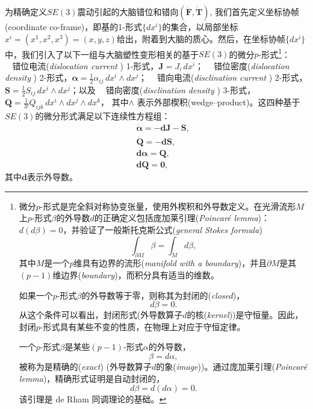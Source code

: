 \documentclass[11pt,fontset=founder]{ctexart}
\begin{document}
为精确定义$SE(3)$震动引起的大脑错位和错向$(\boldsymbol{\dot{\mathbf F},\dot{\mathbf T}})$, 我们首先定义坐标协帧(coordinate co-frame)，即基的1-形式$\{dx^{i}\}$的集合，以局部坐标$x^{i}=(x^{1},x^{2},x^{3})=(x,y,z)$给出，附着到大脑的质心。然后，在坐标协帧$\{dx^{i}\}$中，我们引入了以下一组与大脑塑性变形相关的基于$SE(3)$的微分$p$-形式\footnote{%
微分$p$-形式是完全斜对称协变张量，使用外楔积和外导数定义。在光滑流形$M$上$p$-形式$\beta $的外导数$d$的正确定义包括庞加莱引理(\textit{Poincar\'{e} lemma})：{$d(d\beta )=0$}，并验证了一般斯托克斯公式(\textit{general Stokes formula})
\[
\int_{\partial M}\beta =\int_{M}d\beta ,
\]
其中$M$是一个$p$维具有边界的流形(\emph{manifold with a boundary})，并且$\partial M$是其$(p-1)$维边界(\emph{boundary})，而积分具有适当的维数。
\par
如果一个$p$-形式$\beta $的外导数等于零，则称其为封闭的(\emph{closed})，
\[
d\beta =0.
\]
从这个条件可以看出，封闭形式(外导数算子$d$的核(\emph{kernel}))是守恒量。因此，封闭$p$-形式具有某些不变的性质，在物理上对应于守恒定律。
\par
一个$p$-形式$\beta $是某些$(p-1)$-形式$ \alpha $的外导数，
\[
\beta =d\alpha ,
\]
被称为是精确的(\emph{exact}) (外导数算子$d$的象(\emph{image}))。通过庞加莱引理(\textit{Poincar\'{e} lemma})，精确形式证明是自动封闭的，
\[
d\beta =d(d\alpha )=0.
\]
该引理是 de Rham 同调理论的基础。}：\newline\\
$~~~~$错位电流(\emph{dislocation current }) 1-形式，$\mathbf{J}=J_{i}\,dx^{i}$；%
\newline
$~~~~$错位密度(\emph{dislocation density }) 2-形式，$\mathbf{\alpha }=\frac{1}{2} \alpha _{ij}\,dx^{i}\wedge dx^{j}$；\newline
$~~~~$错向电流(\emph{disclination current }) 2-形式，$\mathbf{S}=\frac{1}{2} S_{ij}\,dx^{i}\wedge dx^{j}$；以及\newline
$~~~~$错向密度(\emph{disclination density }) 3-形式，$\mathbf{Q}=\frac{1}{3!} Q_{ijk}\,dx^{i}\wedge dx^{j}\wedge dx^{k}$，\newline
其中$\wedge $ 表示外部楔积(wedge--product)。这四种基于$SE(3)$的微分形式满足以下连续性方程组：
\begin{eqnarray}
&&\boldsymbol{\dot{\alpha}}=\mathbf{-dJ-S,}  \label{dis1} \\
&&\boldsymbol{\dot{\mathbf Q}}=\mathbf{-dS,}  \label{dis2} \\
&&\mathbf{d\alpha }=\mathbf{Q,}  \label{dis3} \\
&&\mathbf{dQ}=\mathbf{0,}\qquad   \label{dis4}
\end{eqnarray}
其中$\mathbf{d}$表示外导数。
\end{document}
